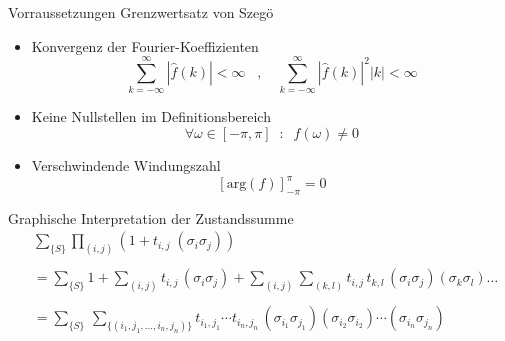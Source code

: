 \documentclass[11pt]{beamer}
\begin{document}
    \begin{frame}
        \centering 
    \end{frame}



    \begin{frame}{Vorraussetzungen Grenzwertsatz von Szegö}
        \begin{itemize}
            \item Konvergenz der Fourier-Koeffizienten
            \begin{equation} \nonumber
                \sum_{k = -\infty}^{\infty} |\hat{f}(k)| < \infty \;\;\;\text{, }\;\;\;
                \sum_{k = -\infty}^{\infty} |\hat{f}(k)|^2 |k| < \infty 
            \end{equation}
            
            \item Keine Nullstellen im Definitionsbereich
            \begin{equation} \nonumber
            \forall \omega \in [-\pi,\pi]\;\; :\;\; f(\omega) \neq 0
            \end{equation}
            
            \item Verschwindende Windungszahl 
            \begin{equation} \nonumber
            \left[\mathrm{arg}\left( f\right)\right]_{-\pi}^{\pi} = 0 
            \end{equation}
            \end{itemize}
    \end{frame}
        
    \begin{frame}{Graphische Interpretation der Zustandssumme}
        \begin{align} \nonumber
            &\sum_{\{S\}} \prod_{(i,j)} (1 +  t_{i,j} \; (\sigma_i \sigma_j)) \\ \nonumber
            &\\ \nonumber
            &= 
            \sum_{\{S\}} 1 + \sum_{(i,j)} t_{i,j}\,(\sigma_i \sigma_j) + \sum_{(i,j)}\sum_{(k,l)} t_{i,j}\, t_{k,l}\,(\sigma_i \sigma_j)  (\sigma_k \sigma_l) \dots \nonumber \\ \nonumber
            &\\ \nonumber
            &= \sum_{\{S\}} \, \sum_{\{(i_1,j_1,...,i_n,j_n)\}} t_{i_1,j_1} \cdots t_{i_n,j_n} \, (\sigma_{i_1} \sigma_{j_1})(\sigma_{i_2} \sigma_{i_2}) \cdots (\sigma_{i_n} \sigma_{j_n}) \nonumber
        \end{align}
    \end{frame}
\end{document}
